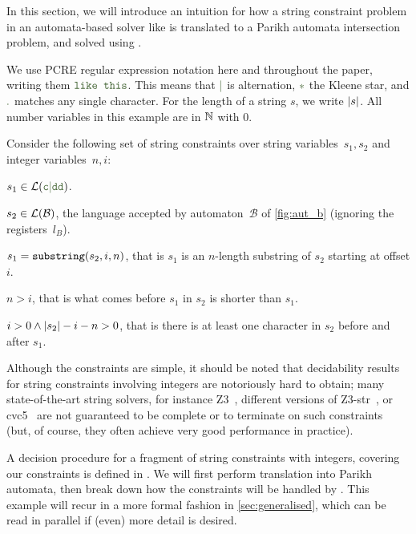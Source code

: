 In this section, we will introduce an intuition for how a string constraint
problem in an automata-based solver like \OstrichPlus{} is translated to a
Parikh automata intersection problem, and solved using \Calculus{}.

We use PCRE regular expression notation here and throughout the paper, writing
them $\Regex{\texttt{like this}}$. This means that $\Regex{\RegexOr{}}$ is alternation,
$\Regex{\mathtt{*}}$ the Kleene star, and $\Regex{\mathtt{.}}$ matches any single character.
For the length of a string $s$, we write $|s|$. All number variables in
this example are in $\mathbb{N}$ with $0$.

\begin{example}\label{ex:string-constraints} Consider the following set of
    string constraints over string variables~$s_1, s_2$ and integer
    variables~$n, i$:
\begin{constraints}
    \item\label{const:s1-in-c-dd} $s_1 \in \Language(\Regex{c\RegexOr{}dd})$.
    \item\label{const:s2-in-b} $s_2 \in \operatorname{\mathcal{L}}(\mathcal{B})$, the language accepted by
    automaton~$\mathcal{B}$ of \cref{fig:aut_b} (ignoring
    the registers~$l_B$).
    \item\label{const:s1-substring} $s_1 = \operatorname{\mathtt{substring}}(s_2, i, n)$, that is $s_1$ is an
    $n$-length substring of $s_2$ starting at offset $i$.
    \item\label{const:more-inside-than-before} $n > i$, that is what comes
    before $s_1$ in $s_2$ is shorter than $s_1$.
    \item\label{const:something-before-and-after} $i > 0 \land |s_2| -i -n > 0$, that
    is there is at least one character in $s_2$ before and after $s_1$.
\end{constraints}
\end{example}

Although the constraints are simple, it should be noted that
decidability results for string constraints involving integers are
notoriously hard to obtain; many state-of-the-art string solvers, for
instance Z3~\cite{Z3}, different versions of
Z3-str~\cite{Z3-str,DBLP:conf/fm/MoraBKNG21}, or
cvc5~\cite{cvc5}
are not guaranteed to be complete or to terminate on such constraints
(but, of course, they often achieve very good performance in practice).

A decision procedure for a fragment of string constraints with integers,
covering our constraints is defined in
\cite{ostrich-plus}.
%
We will first perform translation into Parikh
automata, then break down how the constraints will be handled by \Calculus{}.
This example will recur in a more formal fashion in \cref{sec:generalised},
which can be read in parallel if (even) more detail is desired.

